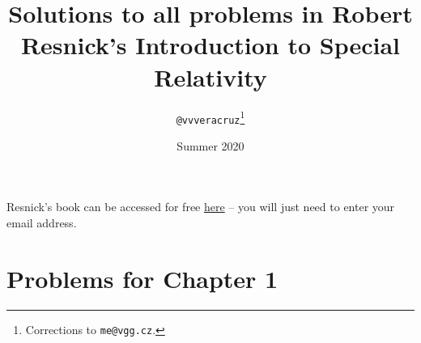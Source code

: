 \documentclass[a4paper]{article}
\title{Solutions to all problems in Robert Resnick's Introduction to Special Relativity}
\date{Summer 2020}
\author{\texttt{@vvveracruz}\thanks{Corrections to \texttt{me@vgg.cz}.}}
\begin{document}
\maketitle

Resnick's book can be accessed for free \href{https://www.academia.edu/37630461/Robert_Resnick_-_Introduction_to_Special_Relativity_1968_Wiley_.pdf?auto=download}{here} -- you will just need to enter your email address.

\section*{Problems for Chapter 1}
  

\printbibliography
{}
\end{document}

